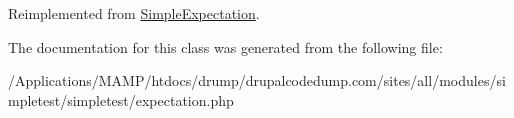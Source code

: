 Reimplemented from \hyperlink{class_simple_expectation_a15b69edf659c76f6543aa98d8d85b025}{SimpleExpectation}.

The documentation for this class was generated from the following file:\begin{DoxyCompactItemize}
\item 
/Applications/MAMP/htdocs/drump/drupalcodedump.com/sites/all/modules/simpletest/simpletest/expectation.php\end{DoxyCompactItemize}
